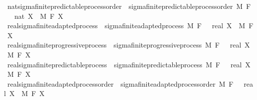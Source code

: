 \begin{isabellebody}
\isamarkupfalse%
\ nat{\isacharunderscore}{\kern0pt}sigma{\isacharunderscore}{\kern0pt}finite{\isacharunderscore}{\kern0pt}predictable{\isacharunderscore}{\kern0pt}process{\isacharunderscore}{\kern0pt}order\ {\isacharequal}{\kern0pt}\ sigma{\isacharunderscore}{\kern0pt}finite{\isacharunderscore}{\kern0pt}predictable{\isacharunderscore}{\kern0pt}process{\isacharunderscore}{\kern0pt}order\ M\ F\ {\isachardoublequoteopen}{}\ {\isacharcolon}{\kern0pt}{\isacharcolon}{\kern0pt}\ nat{\isachardoublequoteclose}\ X\ \ M\ F\ X\isanewline
\isanewline
\isanewline
\isanewline
{}\isamarkupfalse%
\ real{\isacharunderscore}{\kern0pt}sigma{\isacharunderscore}{\kern0pt}finite{\isacharunderscore}{\kern0pt}adapted{\isacharunderscore}{\kern0pt}process\ {\isacharequal}{\kern0pt}\ sigma{\isacharunderscore}{\kern0pt}finite{\isacharunderscore}{\kern0pt}adapted{\isacharunderscore}{\kern0pt}process\ M\ F\ {\isachardoublequoteopen}{}\ {\isacharcolon}{\kern0pt}{\isacharcolon}{\kern0pt}\ real{\isachardoublequoteclose}\ X\ \ M\ F\ X\isanewline
{}\isamarkupfalse%
\ real{\isacharunderscore}{\kern0pt}sigma{\isacharunderscore}{\kern0pt}finite{\isacharunderscore}{\kern0pt}progressive{\isacharunderscore}{\kern0pt}process\ {\isacharequal}{\kern0pt}\ sigma{\isacharunderscore}{\kern0pt}finite{\isacharunderscore}{\kern0pt}progressive{\isacharunderscore}{\kern0pt}process\ M\ F\ {\isachardoublequoteopen}{}\ {\isacharcolon}{\kern0pt}{\isacharcolon}{\kern0pt}\ real{\isachardoublequoteclose}\ X\ \ M\ F\ X\isanewline
{}\isamarkupfalse%
\ real{\isacharunderscore}{\kern0pt}sigma{\isacharunderscore}{\kern0pt}finite{\isacharunderscore}{\kern0pt}predictable{\isacharunderscore}{\kern0pt}process\ {\isacharequal}{\kern0pt}\ sigma{\isacharunderscore}{\kern0pt}finite{\isacharunderscore}{\kern0pt}predictable{\isacharunderscore}{\kern0pt}process\ M\ F\ {\isachardoublequoteopen}{}\ {\isacharcolon}{\kern0pt}{\isacharcolon}{\kern0pt}\ real{\isachardoublequoteclose}\ X\ \ M\ F\ X\isanewline
\isanewline
{}\isamarkupfalse%
\ real{\isacharunderscore}{\kern0pt}sigma{\isacharunderscore}{\kern0pt}finite{\isacharunderscore}{\kern0pt}adapted{\isacharunderscore}{\kern0pt}process{\isacharunderscore}{\kern0pt}order\ {\isacharequal}{\kern0pt}\ sigma{\isacharunderscore}{\kern0pt}finite{\isacharunderscore}{\kern0pt}adapted{\isacharunderscore}{\kern0pt}process{\isacharunderscore}{\kern0pt}order\ M\ F\ {\isachardoublequoteopen}{}\ {\isacharcolon}{\kern0pt}{\isacharcolon}{\kern0pt}\ real{\isachardoublequoteclose}\ X\ \ M\ F\ X\isanewline

\end{isabellebody}

